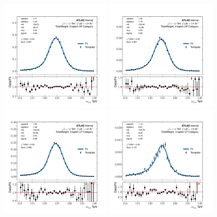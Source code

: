 \begin{figure}[htpb]
  \centering
  \includegraphics[width=0.48\textwidth]{figures/hmm/signalFits/sigfit-cat3lep0-TotalWeight.pdf}
  \includegraphics[width=0.48\textwidth]{figures/hmm/signalFits/sigfit-cat4lep0-TotalWeight.pdf}
  \includegraphics[width=0.48\textwidth]{figures/hmm/signalFits/sigfit-cat3lep1-TotalWeight.pdf}
  \includegraphics[width=0.48\textwidth]{figures/hmm/signalFits/sigfit-cat4lep1-TotalWeight.pdf}

\end{figure}
